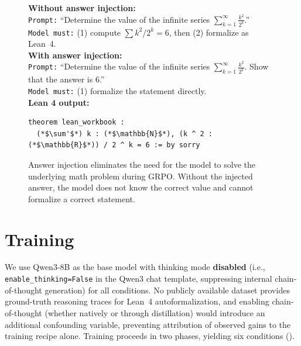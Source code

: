 \documentclass[11pt,a4paper]{article}
\begin{document}
\begin{figure}[t]
\centering
\begin{mdframed}[backgroundcolor=codebg, linecolor=codeframe, linewidth=0.6pt, roundcorner=2pt]
{\small
\textbf{Without answer injection:}\\[2pt]
\texttt{Prompt:} ``Determine the value of the infinite series $\sum_{k=1}^{\infty} \frac{k^2}{2^k}$.''\\
\texttt{Model must:} (1) compute $\sum k^2/2^k = 6$, then (2) formalize as Lean~4.\\[4pt]
\textbf{With answer injection:}\\[2pt]
\texttt{Prompt:} ``Determine the value of the infinite series $\sum_{k=1}^{\infty} \frac{k^2}{2^k}$. Show that the answer is 6.''\\
\texttt{Model must:} (1) formalize the statement directly.\\[4pt]
\textbf{Lean 4 output:}
\begin{lstlisting}
theorem lean_workbook :
  (*$\sum'$*) k : (*$\mathbb{N}$*), (k ^ 2 : (*$\mathbb{R}$*)) / 2 ^ k = 6 := by sorry
\end{lstlisting}
}
\end{mdframed}
\caption{Answer injection eliminates the need for the model to solve the underlying math problem during GRPO. Without the injected answer, the model does not know the correct value and cannot formalize a correct statement.}
\label{fig:answer_injection}
\end{figure}

\section{Training}\label{sec:training}

We use Qwen3-8B \citep{qwen2025qwen3} as the base model with thinking mode \textbf{disabled} (i.e., \texttt{enable\_thinking=False} in the Qwen3 chat template, suppressing internal chain-of-thought generation) for all conditions. No publicly available dataset provides ground-truth reasoning traces for Lean~4 autoformalization, and enabling chain-of-thought (whether natively or through distillation) would introduce an additional confounding variable, preventing attribution of observed gains to the training recipe alone. Training proceeds in two phases, yielding six conditions ().
\end{document}
